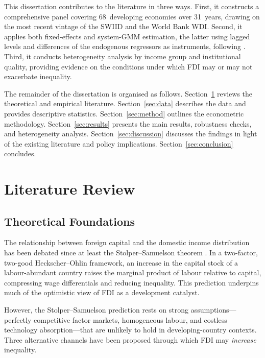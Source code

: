 \documentclass[12pt,a4paper]{article}
\begin{document}
This dissertation contributes to the literature in three ways.  First, it constructs a comprehensive panel covering 68~developing economies over 31~years, drawing on the most recent vintage of the SWIID \citep{Solt2020} and the World Bank WDI.  Second, it applies both fixed-effects and system-GMM estimation, the latter using lagged levels and differences of the endogenous regressors as instruments, following \citet{Blundell1998}.  Third, it conducts heterogeneity analysis by income group and institutional quality, providing evidence on the conditions under which FDI may or may not exacerbate inequality.

The remainder of the dissertation is organised as follows.  Section~\ref{sec:lit} reviews the theoretical and empirical literature.  Section~\ref{sec:data} describes the data and provides descriptive statistics.  Section~\ref{sec:method} outlines the econometric methodology.  Section~\ref{sec:results} presents the main results, robustness checks, and heterogeneity analysis.  Section~\ref{sec:discussion} discusses the findings in light of the existing literature and policy implications.  Section~\ref{sec:conclusion} concludes.


\section{Literature Review}\label{sec:lit}

\subsection{Theoretical Foundations}

The relationship between foreign capital and the domestic income distribution has been debated since at least the Stolper--Samuelson theorem \citep{Stolper1941}.  In a two-factor, two-good Heckscher--Ohlin framework, an increase in the capital stock of a labour-abundant country raises the marginal product of labour relative to capital, compressing wage differentials and reducing inequality.  This prediction underpins much of the optimistic view of FDI as a development catalyst.

However, the Stolper--Samuelson prediction rests on strong assumptions---perfectly competitive factor markets, homogeneous labour, and costless technology absorption---that are unlikely to hold in developing-country contexts.  Three alternative channels have been proposed through which FDI may \textit{increase} inequality.
\end{document}
